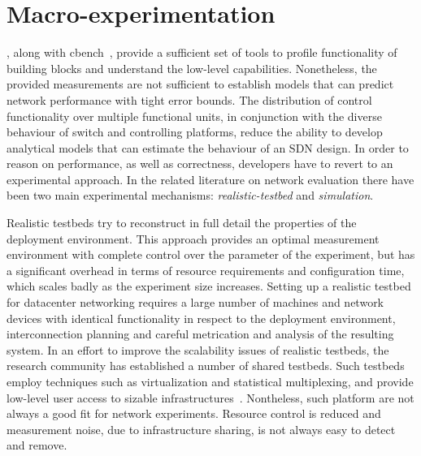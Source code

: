 

\section{\of Macro-experimentation} \label{sec:sdnsim-intro}


\oflops, along with cbench~\cite{cbench}, provide a sufficient set of tools to
profile functionality of \of building blocks and understand the low-level
capabilities. Nonetheless, the provided measurements are not sufficient to
establish models that can predict network performance with tight error bounds.
The distribution of control functionality over multiple functional units, in
conjunction with the diverse behaviour of \of switch and controlling platforms,
reduce the ability to develop analytical models that can estimate the behaviour
of an SDN design. In order to reason on performance, as well as correctness,
developers have to revert to an experimental approach.  In the related
literature on network evaluation there have been two main experimental
mechanisms: \emph{realistic-testbed} and \emph{simulation}.

Realistic testbeds try to reconstruct in full detail the properties of the
deployment environment. This approach provides an optimal measurement
environment with complete control over the parameter of the experiment, but has
a significant overhead in terms of resource requirements and configuration time,
which scales badly as the experiment size increases.  Setting up a realistic
testbed for datacenter networking requires a large number of machines and
network devices with identical functionality in respect to the deployment
environment, interconnection planning and careful metrication and analysis of
the resulting system. In an effort to improve the scalability issues of
realistic testbeds, the research community has established a number of shared
testbeds. Such testbeds employ techniques such as virtualization and statistical
multiplexing, and provide low-level user access to sizable
infrastructures~\cite{planetlab,emulab}.  Nontheless, such platform are not
always a good fit for network experiments. Resource control
is reduced and measurement noise, due to infrastructure sharing, is not always
easy to detect and remove. 

